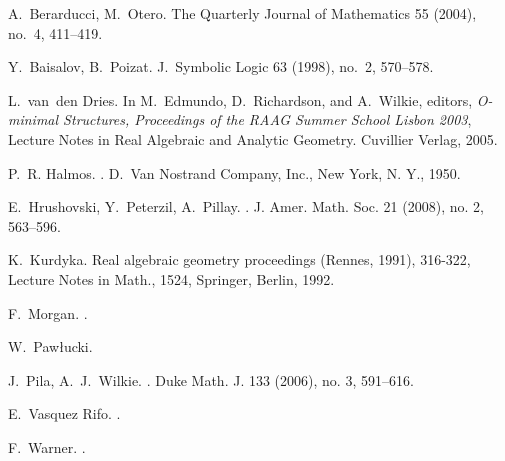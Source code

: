 \documentclass[a4paper, 12pt, final]{article}
\newtheorem{open problem}[lem]{Open problem}
\theoremstyle{remark}
\theoremstyle{definition}
\newtheorem{final remark}[lem]{Final remark}
\begin{document}
\begin{thebibliography}{Morgan88}

 A.~Berarducci, M.~Otero. 
\newblock The Quarterly Journal of Mathematics 55 (2004), no.~4, 411--419. 

 Y.~Baisalov, B.~Poizat.
\newblock J.~Symbolic Logic  63  (1998),  no.~2, 570--578.

L.~van~den Dries.
\newblock In M.~Edmundo, D.~Richardson, and A.~Wilkie, editors, {\em O-minimal
  Structures, Proceedings of the RAAG Summer School Lisbon 2003}, Lecture Notes
  in Real Algebraic and Analytic Geometry. Cuvillier Verlag, 2005.

P.~R. Halmos.
.
\newblock D.~Van Nostrand Company, Inc., New York, N. Y., 1950.

 E.~Hrushovski,  Y.~Peterzil, A.~Pillay. 
.
\newblock J. Amer. Math. Soc.  21  (2008),  no. 2, 563--596.

K.~Kurdyka. 
\newblock Real algebraic geometry proceedings (Rennes, 1991), 316-322, Lecture Notes in Math., 1524, Springer, Berlin, 1992.

F.~Morgan.
.

 W.~Paw{\l}ucki. 

 J.~Pila, A.~J.~Wilkie.
.
\newblock Duke Math. J.  133  (2006),  no. 3, 591--616.

E.~Vasquez Rifo.
.

F.~Warner.
.
\newblock{}

\end{thebibliography}
\end{document}
